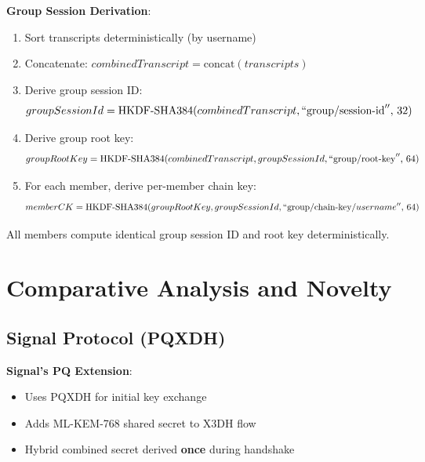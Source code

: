 \documentclass[11pt,a4paper,oneside]{article}
\begin{document}
\textbf{Group Session Derivation}:

\begin{enumerate}
\item Sort transcripts deterministically (by username)

\item Concatenate: $combinedTranscript = \text{concat}(transcripts)$

\item Derive group session ID:
\begin{equation}
groupSessionId = \text{HKDF-SHA384}(combinedTranscript, ``\text{group/session-id}''\text{, } 32)
\end{equation}

\item Derive group root key:
\begin{equation}
groupRootKey = \text{HKDF-SHA384}(combinedTranscript, groupSessionId, ``\text{group/root-key}''\text{, } 64)
\end{equation}

\item For each member, derive per-member chain key:
\begin{equation}
memberCK = \text{HKDF-SHA384}(groupRootKey, groupSessionId, ``\text{group/chain-key/}username''\text{, } 64)
\end{equation}
\end{enumerate}

All members compute identical group session ID and root key deterministically.

\section{Comparative Analysis and Novelty}

\subsection{Signal Protocol (PQXDH)}

\textbf{Signal's PQ Extension}:
\begin{itemize}
\item Uses PQXDH for initial key exchange
\item Adds ML-KEM-768 shared secret to X3DH flow
\item Hybrid combined secret derived \textbf{once} during handshake
\end{itemize}
\end{document}
